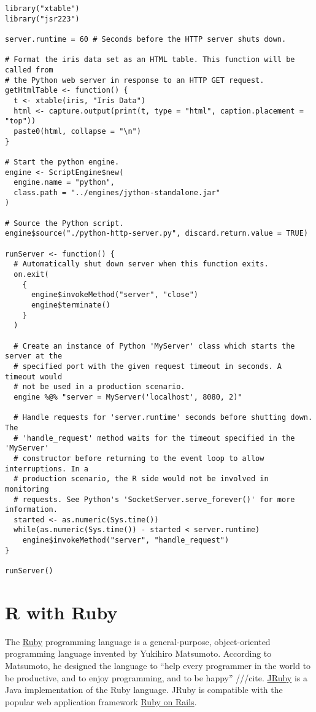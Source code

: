 \begin{verbatim}
library("xtable")
library("jsr223")

server.runtime = 60 # Seconds before the HTTP server shuts down.

# Format the iris data set as an HTML table. This function will be called from
# the Python web server in response to an HTTP GET request.
getHtmlTable <- function() {
  t <- xtable(iris, "Iris Data")
  html <- capture.output(print(t, type = "html", caption.placement = "top"))
  paste0(html, collapse = "\n")
}

# Start the python engine.
engine <- ScriptEngine$new(
  engine.name = "python",
  class.path = "../engines/jython-standalone.jar"
)

# Source the Python script.
engine$source("./python-http-server.py", discard.return.value = TRUE)

runServer <- function() {
  # Automatically shut down server when this function exits.
  on.exit(
    {
      engine$invokeMethod("server", "close")
      engine$terminate()
    }
  )
  
  # Create an instance of Python 'MyServer' class which starts the server at the
  # specified port with the given request timeout in seconds. A timeout would 
  # not be used in a production scenario.
  engine %@% "server = MyServer('localhost', 8080, 2)"
  
  # Handle requests for 'server.runtime' seconds before shutting down. The 
  # 'handle_request' method waits for the timeout specified in the 'MyServer' 
  # constructor before returning to the event loop to allow interruptions. In a
  # production scenario, the R side would not be involved in monitoring 
  # requests. See Python's 'SocketServer.serve_forever()' for more information.
  started <- as.numeric(Sys.time())
  while(as.numeric(Sys.time()) - started < server.runtime)
    engine$invokeMethod("server", "handle_request")
}

runServer()
\end{verbatim}

\section{R with Ruby}

The \href{https://www.ruby-lang.org}{Ruby} programming language is a general-purpose, object-oriented programming language invented by Yukihiro Matsumoto. According to Matsumoto, he designed the language to “help every programmer in the world to be productive, and to enjoy programming, and to be happy” ///cite. \href{http://jruby.org/}{JRuby} is a Java implementation of the Ruby language. JRuby is compatible with the popular web application framework \href{http://rubyonrails.org/}{Ruby on Rails}.

